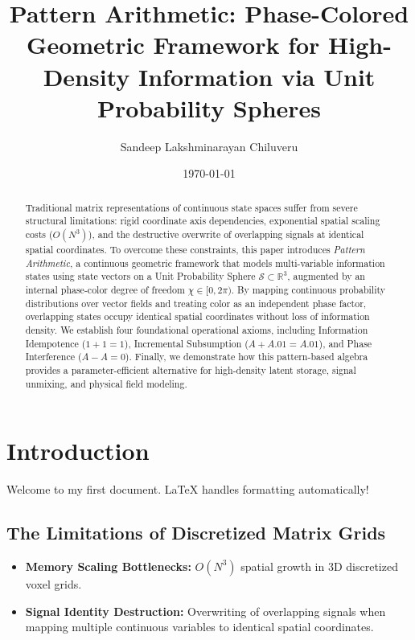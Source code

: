 \documentclass[12pt, a4paper]{article}
\title{Pattern Arithmetic: Phase-Colored Geometric Framework for High-Density Information via Unit Probability Spheres}
\author{Sandeep Lakshminarayan Chiluveru}
\date{\today}
\begin{document}
\maketitle

\begin{abstract}
Traditional matrix representations of continuous state spaces suffer from severe structural limitations: rigid coordinate axis dependencies, exponential spatial scaling costs ($O(N^3)$), and the destructive overwrite of overlapping signals at identical spatial coordinates. To overcome these constraints, this paper introduces \textit{Pattern Arithmetic}, a continuous geometric framework that models multi-variable information states using state vectors on a Unit Probability Sphere $\mathcal{S} \subset \mathbb{R}^3$, augmented by an internal phase-color degree of freedom $\chi \in [0, 2\pi)$. By mapping continuous probability distributions over vector fields and treating color as an independent phase factor, overlapping states occupy identical spatial coordinates without loss of information density. We establish four foundational operational axioms, including Information Idempotence ($1 + 1 = 1$), Incremental Subsumption ($A + A.01 = A.01$), and Phase Interference ($A - A = 0$). Finally, we demonstrate how this pattern-based algebra provides a parameter-efficient alternative for high-density latent storage, signal unmixing, and physical field modeling.
\end{abstract}

\section{Introduction}
Welcome to my first document. LaTeX handles formatting automatically!

\subsection{The Limitations of Discretized Matrix Grids}
\begin{itemize}
    \item \textbf{Memory Scaling Bottlenecks:} $O(N^3)$ spatial growth in 3D discretized voxel grids.
    \item \textbf{Signal Identity Destruction:} Overwriting of overlapping signals when mapping multiple continuous variables to identical spatial coordinates.
\end{itemize}
\end{document}
